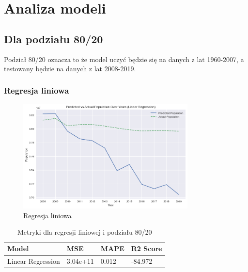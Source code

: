 \documentclass[11pt]{article}
\begin{document}
\section{Analiza modeli}
\subsection{Dla podziału 80/20}
Podział 80/20 oznacza to że model uczyć będzie się na danych z lat 1960-2007, a testowany będzie na danych z lat 2008-2019.
\subsubsection{Regresja liniowa}
\begin{figure}[H]
        \centering
        \includegraphics[width=0.8\textwidth]{images/linear.png}
        \caption{Regresja liniowa}
\end{figure}
\begin{table}[H]
        \centering
        \begin{tabular}{|l|l|l|l|}
        \hline
        Model & MSE & MAPE & R2 Score \\ \hline
        Linear Regression & 3.04e+11 & 0.012 & -84.972 \\ \hline
        \end{tabular}
        \caption{Metryki dla regresji liniowej i podziału 80/20}
        \end{table}
\end{document}
